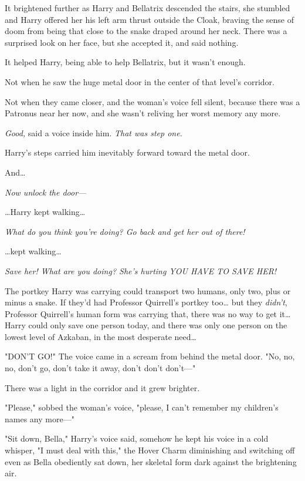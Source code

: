 It brightened further as Harry and Bellatrix descended the stairs, she stumbled 
and Harry offered her his left arm thrust outside the Cloak, braving the sense 
of doom from being that close to the snake draped around her neck. There was a 
surprised look on her face, but she accepted it, and said nothing.

It helped Harry, being able to help Bellatrix, but it wasn't enough.

Not when he saw the huge metal door in the center of that level's corridor.

Not when they came closer, and the woman's voice fell silent, because there was 
a Patronus near her now, and she wasn't reliving her worst memory any more.

\emph{Good,} said a voice inside him. \emph{That was step one.}

Harry's steps carried him inevitably forward toward the metal door.

And{\ldots}

\emph{Now unlock the door---}

{\ldots}Harry kept walking{\ldots}

\emph{What do you think you're doing? Go back and get her out of there!}

{\ldots}kept walking{\ldots}

\emph{Save her! What are you doing? She's hurting YOU HAVE TO SAVE HER!}

The portkey Harry was carrying could transport two humans, only two, plus or 
minus a snake. If they'd had Professor Quirrell's portkey too{\ldots} but they 
\emph{didn't}, Professor Quirrell's human form was carrying that, there was no 
way to get it{\ldots} Harry could only save one person today, and there was 
only one person on the lowest level of Azkaban, in the most desperate 
need{\ldots}

"DON'T GO!" The voice came in a scream from behind the metal door. "No, no, no, 
don't go, don't take it away, don't don't don't---"

There was a light in the corridor and it grew brighter.

"Please," sobbed the woman's voice, "please, I can't remember my children's 
names any more---"

"Sit down, Bella," Harry's voice said, somehow he kept his voice in a cold 
whisper, "I must deal with this," the Hover Charm diminishing and switching off 
even as Bella obediently sat down, her skeletal form dark against the 
brightening air.

